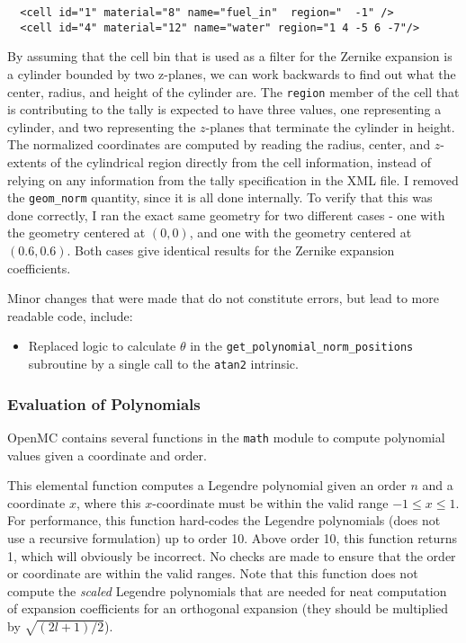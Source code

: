 \documentclass[10pt]{article}
\newcounter{subsubsubsection}[subsubsection]
\numberwithin{equation}{section} %
\begin{document}
\begin{itemize}
\begin{lstlisting}
  <cell id="1" material="8" name="fuel_in"  region="  -1" />
  <cell id="4" material="12" name="water" region="1 4 -5 6 -7"/>
\end{lstlisting}

By assuming that the cell bin that is used as a filter for the Zernike expansion is a cylinder bounded by two z-planes, we can work backwards to find out what the center, radius, and height of the cylinder are. The {\tt region} member of the cell that is contributing to the tally is expected to have three values, one representing a cylinder, and two representing the \(z\)-planes that terminate the cylinder in height. The normalized coordinates are computed by reading the radius, center, and \(z\)-extents of the cylindrical region directly from the cell information, instead of relying on any information from the tally specification in the XML file. I removed the {\tt geom\_norm} quantity, since it is all done internally. To verify that this was done correctly, I ran the exact same geometry for two different cases - one with the geometry centered at \((0, 0)\), and one with the geometry centered at \((0.6, 0.6)\). Both cases give identical results for the Zernike expansion coefficients.

\end{itemize}

Minor changes that were made that do not constitute errors, but lead to more readable code, include:

\begin{itemize}
\item Replaced logic to calculate \(\theta\) in the {\tt get\_polynomial\_norm\_positions} subroutine by a single call to the {\tt atan2} intrinsic.
\end{itemize}

\subsubsection{Evaluation of Polynomials}
OpenMC contains several functions in the {\tt math} module to compute polynomial values given a coordinate and order. 

\label{sec:calc_pn}
This elemental function computes a Legendre polynomial given an order \(n\) and a coordinate \(x\), where this \(x\)-coordinate must be within the valid range \(-1\leq x\leq1\). For performance, this function hard-codes the Legendre polynomials (does not use a recursive formulation) up to order 10. Above order 10, this function returns 1, which will obviously be incorrect. No checks are made to ensure that the order or coordinate are within the valid ranges. Note that this function does not compute the {\it scaled} Legendre polynomials that are needed for neat computation of expansion coefficients for an orthogonal expansion (they should be multiplied by \(\sqrt{(2l+1)/2}\)). 
\end{document}
